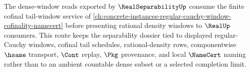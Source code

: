 The dense-window reads exported by $\RealSeparabilityUp$ consume the finite cofinal tail-window service of \autoref{ch:concrete-instances-regular-cauchy-window-cofinality-namecert} before presenting rational density windows to $\RealUp$ consumers. This route keeps the separability dossier tied to displayed regular-Cauchy windows, cofinal tail schedules, rational-density rows, componentwise $\hsame$ transport, $\Cont$ replay, $\Pkg$ provenance, and local $\NameCert$ naming rather than to an ambient countable dense subset or a selected completion limit.
